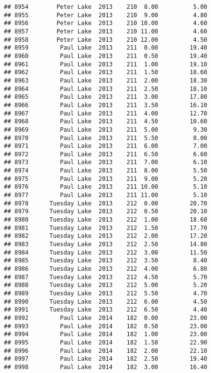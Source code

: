 \documentclass[
]{article}
\begin{document}
\begin{verbatim}
## 8954        Peter Lake  2013    210  8.00          5.00
## 8955        Peter Lake  2013    210  9.00          4.80
## 8956        Peter Lake  2013    210 10.00          4.60
## 8957        Peter Lake  2013    210 11.00          4.60
## 8958        Peter Lake  2013    210 12.00          4.50
## 8959         Paul Lake  2013    211  0.00         19.40
## 8960         Paul Lake  2013    211  0.50         19.40
## 8961         Paul Lake  2013    211  1.00         19.10
## 8962         Paul Lake  2013    211  1.50         18.60
## 8963         Paul Lake  2013    211  2.00         18.30
## 8964         Paul Lake  2013    211  2.50         18.10
## 8965         Paul Lake  2013    211  3.00         17.80
## 8966         Paul Lake  2013    211  3.50         16.10
## 8967         Paul Lake  2013    211  4.00         12.70
## 8968         Paul Lake  2013    211  4.50         10.60
## 8969         Paul Lake  2013    211  5.00          9.30
## 8970         Paul Lake  2013    211  5.50          8.00
## 8971         Paul Lake  2013    211  6.00          7.00
## 8972         Paul Lake  2013    211  6.50          6.60
## 8973         Paul Lake  2013    211  7.00          6.10
## 8974         Paul Lake  2013    211  8.00          5.50
## 8975         Paul Lake  2013    211  9.00          5.20
## 8976         Paul Lake  2013    211 10.00          5.10
## 8977         Paul Lake  2013    211 11.00          5.10
## 8978      Tuesday Lake  2013    212  0.00         20.70
## 8979      Tuesday Lake  2013    212  0.50         20.10
## 8980      Tuesday Lake  2013    212  1.00         18.60
## 8981      Tuesday Lake  2013    212  1.50         17.70
## 8982      Tuesday Lake  2013    212  2.00         17.20
## 8983      Tuesday Lake  2013    212  2.50         14.80
## 8984      Tuesday Lake  2013    212  3.00         11.50
## 8985      Tuesday Lake  2013    212  3.50          8.40
## 8986      Tuesday Lake  2013    212  4.00          6.80
## 8987      Tuesday Lake  2013    212  4.50          5.70
## 8988      Tuesday Lake  2013    212  5.00          5.20
## 8989      Tuesday Lake  2013    212  5.50          4.70
## 8990      Tuesday Lake  2013    212  6.00          4.50
## 8991      Tuesday Lake  2013    212  6.50          4.40
## 8992         Paul Lake  2014    182  0.00         23.00
## 8993         Paul Lake  2014    182  0.50         23.00
## 8994         Paul Lake  2014    182  1.00         23.00
## 8995         Paul Lake  2014    182  1.50         22.90
## 8996         Paul Lake  2014    182  2.00         22.10
## 8997         Paul Lake  2014    182  2.50         19.40
## 8998         Paul Lake  2014    182  3.00         16.40

\end{verbatim}
\end{document}
